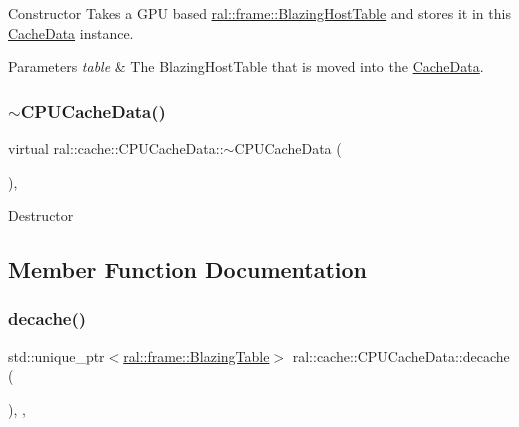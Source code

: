 Constructor Takes a G\+PU based \hyperlink{classral_1_1frame_1_1BlazingHostTable}{ral\+::frame\+::\+Blazing\+Host\+Table} and stores it in this \hyperlink{classral_1_1cache_1_1CacheData}{Cache\+Data} instance. 
\begin{DoxyParams}{Parameters}
{\em table} & The Blazing\+Host\+Table that is moved into the \hyperlink{classral_1_1cache_1_1CacheData}{Cache\+Data}. \\
\hline
\end{DoxyParams}
\mbox{\label{classral_1_1cache_1_1CPUCacheData_acae066424ccf0651bcb17f54aa770bbb}} 
\subsubsection{\texorpdfstring{$\sim$\+C\+P\+U\+Cache\+Data()}{~CPUCacheData()}}
{\footnotesize\ttfamily virtual ral\+::cache\+::\+C\+P\+U\+Cache\+Data\+::$\sim$\+C\+P\+U\+Cache\+Data (\begin{DoxyParamCaption}{ }\end{DoxyParamCaption})\hspace{0.3cm}{\ttfamily [inline]}, {\ttfamily [virtual]}}

Destructor 

\subsection{Member Function Documentation}
\mbox{\label{classral_1_1cache_1_1CPUCacheData_a03a18d3dfd4fe60dffdd0a9daabfbde2}} 
\subsubsection{\texorpdfstring{decache()}{decache()}}
{\footnotesize\ttfamily std\+::unique\+\_\+ptr$<$\hyperlink{classral_1_1frame_1_1BlazingTable}{ral\+::frame\+::\+Blazing\+Table}$>$ ral\+::cache\+::\+C\+P\+U\+Cache\+Data\+::decache (\begin{DoxyParamCaption}{ }\end{DoxyParamCaption})\hspace{0.3cm}{\ttfamily [inline]}, {\ttfamily [override]}, {\ttfamily [virtual]}}

